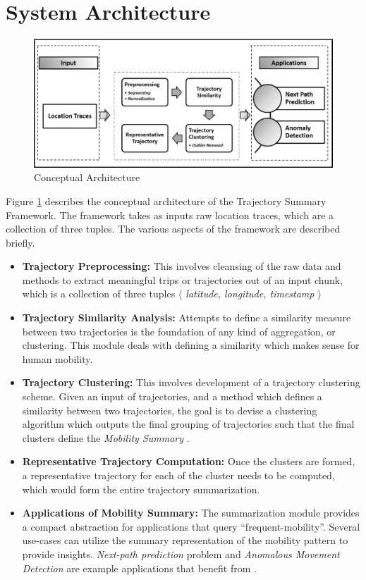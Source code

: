\section{System Architecture}

\label{sec:system}
\begin{figure}
\centering
\includegraphics[scale=0.5]{figs/system_arch.eps}
\caption{Conceptual Architecture}
\label{fig:flow}
\end{figure}

Figure \ref{fig:flow} describes the conceptual architecture of the Trajectory Summary Framework. The framework takes as inputs raw location traces, which are a collection of three tuples. The various aspects of the framework are described briefly.

\begin{itemize}
\item{\textbf{Trajectory Preprocessing:}}
This involves cleansing of the raw data and methods to extract meaningful trips or trajectories out of an input chunk, which is a collection of three tuples \emph{$\langle$ latitude, longitude, timestamp $\rangle$ }
\item{\textbf{Trajectory Similarity Analysis:}}
Attempts to define a similarity measure between two trajectories is the foundation of any kind of aggregation, or clustering. This module deals with defining a similarity which makes sense for human mobility. 
\item{\textbf{Trajectory Clustering:}}
This involves development of a trajectory clustering scheme. Given an input of trajectories, and a method which defines a similarity between two trajectories, the goal is to devise a clustering algorithm which outputs the final grouping of trajectories such that the final clusters define the \textit{Mobility Summary}  .
\item{\textbf{Representative Trajectory Computation:}}
Once the clusters are formed, a representative trajectory for each of the cluster needs to be computed, which would form the entire trajectory summarization.  
\item{\textbf{Applications of Mobility Summary:}}
The summarization module provides a compact abstraction for applications that query ``frequent-mobility''. Several use-cases can utilize the summary representation of the mobility pattern to provide insights. \textit{Next-path prediction} problem and \textit{Anomalous Movement Detection} are example applications that benefit from \trajSummary.
\end{itemize}

